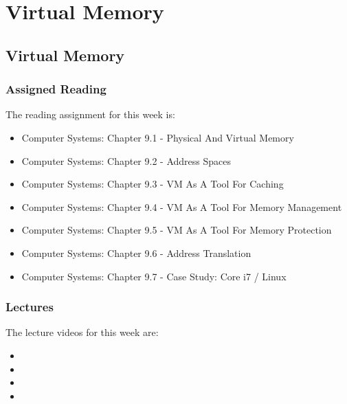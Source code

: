 \clearpage

\renewcommand{\ChapTitle}{Virtual Memory}
\renewcommand{\SectionTitle}{Virtual Memory}
\chapter{\ChapTitle}

\section{\SectionTitle}

\subsection{Assigned Reading}

The reading assignment for this week is:

\begin{itemize}
    \item Computer Systems: Chapter 9.1 - Physical And Virtual Memory
    \item Computer Systems: Chapter 9.2 - Address Spaces
    \item Computer Systems: Chapter 9.3 - VM As A Tool For Caching
    \item Computer Systems: Chapter 9.4 - VM As A Tool For Memory Management
    \item Computer Systems: Chapter 9.5 - VM As A Tool For Memory Protection
    \item Computer Systems: Chapter 9.6 - Address Translation
    \item Computer Systems: Chapter 9.7 - Case Study: Core i7 / Linux
\end{itemize}

\subsection{Lectures}

The lecture videos for this week are:

\begin{itemize}
    \item {}
    \item {}
    \item {}
    \item {}
\end{itemize}


